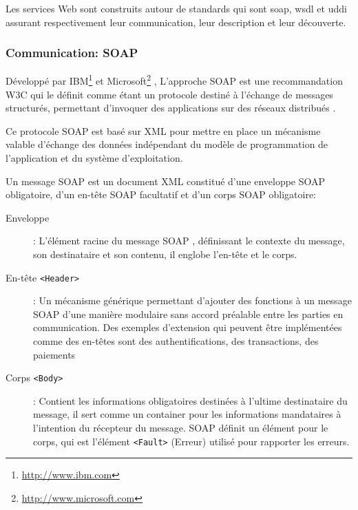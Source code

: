   Les services Web sont construits autour de standards qui sont
  \acrshort{soap}, \acrshort{wsdl} et \acrshort{uddi} assurant
  respectivement leur communication, leur description et leur découverte.
  \newpage

    \subsubsection{Communication: SOAP}
    \label{sec:soap}
    Développé par IBM\footnote{\url{http://www.ibm.com}} et
    Microsoft\footnote{\url{http://www.microsoft.com}}
    \cite{box2000simple}, L'approche \textsc{SOAP} est une
    recommandation \textsc{W3C} qui le définit comme étant un
    protocole destiné à l'échange de messages structurés, permettant
    d'invoquer des applications sur des réseaux
    distribués \cite{mitra2003soap}.

    

    Ce protocole \textsc{SOAP} est basé sur \textsc{XML} pour mettre
    en place un mécanisme valable d'échange des données indépendant du
    modèle de programmation de l'application et du système
    d'exploitation.
      
    Un message \textsc{SOAP} est un document XML constitué d'une enveloppe
    \textsc{SOAP} obligatoire, d'un en-tête \textsc{SOAP} facultatif et
    d'un corps \textsc{SOAP} obligatoire:

    \SpecialItem
    \begin{description} %
      \item[Enveloppe]: L'élément racine du message \textsc{SOAP} ,
        définissant le contexte du message, son destinataire et son
        contenu, il englobe l'en-tête et le corps.
        
      \item[En-tête \texttt{<Header>}]: Un mécanisme générique permettant
        d'ajouter des fonctions à un message \textsc{SOAP} d'une manière
        modulaire sans accord préalable entre les parties en communication.
        Des exemples d'extension qui peuvent être implémentées comme des
        en-têtes sont des authentifications, des transactions, des paiements
        
      \item[Corps \texttt{<Body>}]: Contient les informations obligatoires
        destinées à l'ultime destinataire du message, il sert comme un
        container pour les informations mandataires à l'intention du
        récepteur du message.  \textsc{SOAP} définit un élément pour le
        corps, qui est l'élément \texttt{<Fault>} (Erreur) utilisé pour
        rapporter les erreurs.
    \end{description}

